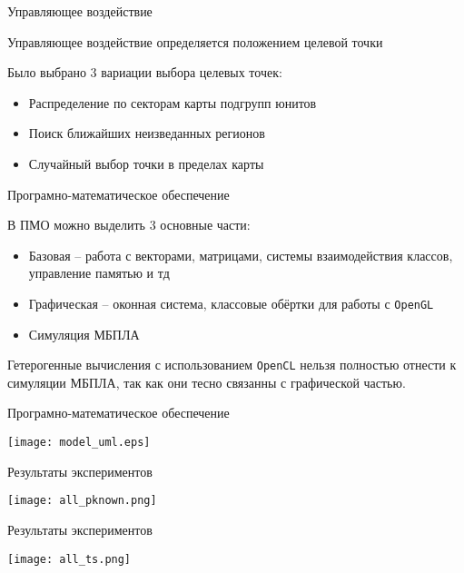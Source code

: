 \begin{tslide}{Управляющее воздействие}

    Управляющее воздействие определяется положением целевой
    точки

    Было выбрано 3 вариации выбора целевых точек:
    \begin{itemize}
        \item Распределение по секторам карты подгрупп юнитов
        \item Поиск ближайших неизведанных регионов
        \item Случайный выбор точки в пределах карты
    \end{itemize}

\end{tslide}

\begin{tslide}{Програмно-математическое обеспечение}

    В ПМО можно выделить 3 основные части:
    \begin{itemize}
        \item Базовая -- работа с векторами, матрицами, системы
    взаимодействия классов, управление памятью и тд

        \item Графическая -- оконная система, классовые обёртки
            для работы с \verb|OpenGL|

        \item Симуляция МБПЛА
    \end{itemize}

    Гетерогенные вычисления с использованием \verb|OpenCL| нельзя
    полностью отнести к симуляции МБПЛА, так как они тесно связанны
    с графической частью.

\end{tslide}

\begin{tslide}{Програмно-математическое обеспечение}

    \centering
    \texttt{[image: model\_uml.eps]}

\end{tslide}

\begin{tslide}{Результаты экспериментов}

    \centering
    \texttt{[image: all\_pknown.png]}
\end{tslide}

\begin{tslide}{Результаты экспериментов}

    \centering
    \texttt{[image: all\_ts.png]}
\end{tslide}

